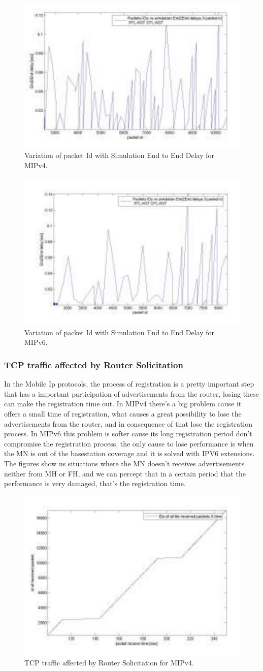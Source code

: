 \documentclass[12pt]{article}
\begin{document}
\begin{figure}[ht]
\centering
\includegraphics[width=.3\textwidth]{topico2_mipv4.png}
\caption{Variation of packet Id with Simulation End to End Delay for MIPv4.}
\label{fig:topico2_mipv4}
\end{figure}


\begin{figure}[ht]
\centering
\includegraphics[width=.3\textwidth]{topico2_mipv6.png}
\caption{Variation of packet Id with Simulation End to End Delay for MIPv6.}
\label{fig:topico2_mipv6}
\end{figure}



\subsubsection{TCP traffic affected by Router Solicitation}

In the Mobile Ip protocols, the process of registration is a pretty important step that has a important participation of advertisements from the router, losing these can make the registration time out. In MIPv4 there's a big problem cause it offers a small time of registration, what causes a great possibility to lose the advertisements from the router, and in consequence of that lose the registration process. In MIPv6 this problem is softer cause its long registration period don't compromise the registration process, the only cause to lose performance is when the MN is out of the basestation coverage and it is solved with IPV6 extensions. The figures show us situations where the MN doesn't receives advertisements neither from MH or FH, and we can percept that in a certain period that the performance is very damaged, that's the registration time.

\begin{figure}[ht]
\centering
\includegraphics[width=.3\textwidth]{topico3_mipv4.png}
\caption{TCP traffic affected by Router Solicitation for MIPv4.}
\label{fig:topico2_mipv4}
\end{figure}
\end{document}

